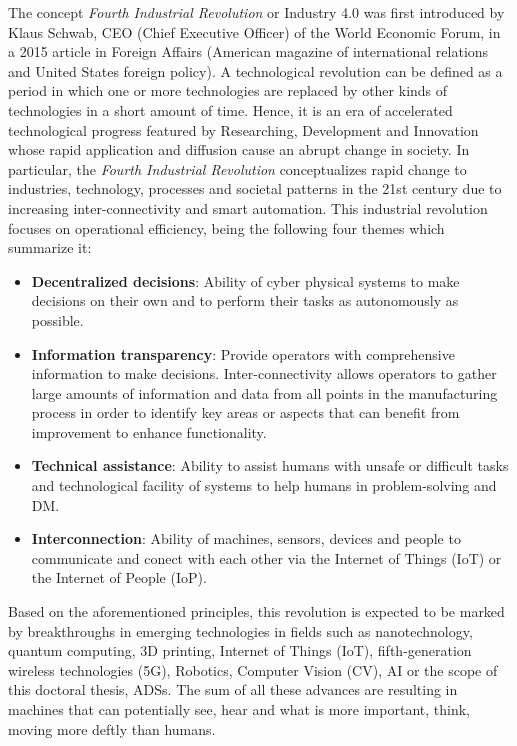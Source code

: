 The concept \textit{Fourth Industrial Revolution} or Industry 4.0  was first introduced by Klaus Schwab, CEO (Chief Executive Officer) of the World Economic Forum, in a 2015 article in Foreign Affairs (American magazine of international relations and United States foreign policy). A technological revolution can be defined as a period in which one or more technologies are replaced by other kinds of technologies in a short amount of time. Hence, it is an era of accelerated technological progress featured by Researching, Development and Innovation whose rapid application and diffusion cause an abrupt change in society. In particular, the \textit{Fourth Industrial Revolution} conceptualizes rapid change to industries, technology, processes and societal patterns in the 21st century due to increasing inter-connectivity and smart automation. This industrial revolution focuses on operational efficiency, being the following four themes which summarize it: 

\begin{itemize}
	
	\item \textbf{Decentralized decisions}: Ability of cyber physical systems to make decisions on their own and to perform their tasks as autonomously as possible.
	
	\item \textbf{Information transparency}: Provide operators with comprehensive information to make decisions. Inter-connectivity allows operators to gather large amounts of information and data from all points in the manufacturing process in order to identify key areas or aspects that can benefit from improvement to enhance functionality.
	
	\item \textbf{Technical assistance}: Ability to assist humans with unsafe or difficult tasks and technological facility of systems to help humans in problem-solving and \ac{DM}.
	
	\item \textbf{Interconnection}: Ability of machines, sensors, devices and people to communicate and conect with each other via the Internet of Things (IoT) or the Internet of People (IoP).
	
\end{itemize}

Based on the aforementioned principles, this revolution is expected to be marked by breakthroughs in emerging technologies in fields such as nanotechnology, quantum computing, 3D printing, Internet of Things (IoT), fifth-generation wireless technologies (5G), Robotics, Computer Vision (CV), \ac{AI} or the scope of this doctoral thesis, \acp{ADS}. The sum of all these advances are resulting in machines that can potentially see, hear and what is more important, think, moving more deftly than humans. 

